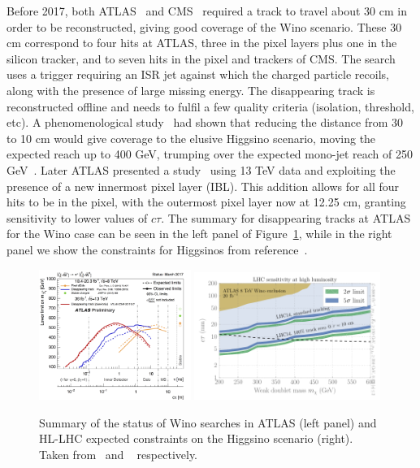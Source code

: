 Before 2017, both ATLAS~\cite{Aad:2013yna} and CMS~\cite{CMS:2014gxa} required a track to travel about 30 cm in order to be reconstructed, giving good coverage of the Wino scenario. These 30 cm correspond to four hits at ATLAS, three in the pixel layers plus one in the silicon tracker, and to seven hits in the pixel and trackers of CMS. The search uses a trigger requiring an ISR jet against which the charged particle recoils, along with the presence of large missing energy. The disappearing track is reconstructed offline and needs to fulfil a few quality criteria (isolation, \pT threshold, etc). A phenomenological study~\cite{Mahbubani:2017gjh} had shown that reducing the distance from 30 to 10 cm would give coverage to the elusive Higgsino scenario, moving the expected reach up to 400 GeV, trumping over the expected mono-jet reach of 250 GeV~\cite{Schwaller:2013baa,Low:2014cba,Barducci:2015ffa}. Later ATLAS presented a study~\cite{ATLAS-CONF-2017-017} using 13 TeV data and exploiting the presence of a new innermost pixel layer (IBL). This addition allows for all four hits to be in the pixel, with the outermost pixel layer now at 12.25 cm,  granting sensitivity to lower values of $c \tau$. The summary for disappearing tracks at ATLAS for the Wino case can be seen in the left panel of Figure~\ref{fig:ewkinosearches}, while in the right panel we show the constraints for Higgsinos from reference~\cite{Mahbubani:2017gjh}.

\begin{figure}[htb]
\centering
\includegraphics[width=0.44\textwidth]{plots/ATLAS_SUSY_LLPChargino.png}
\includegraphics[width=0.54\textwidth]{plots/Higgsino_Significance14}
\caption{Summary of the status of Wino searches in ATLAS (left panel) and HL-LHC expected constraints on the Higgsino scenario (right). Taken from~\cite{ATLAS:summary} and ~\cite{Mahbubani:2017gjh} respectively.}
  \label{fig:ewkinosearches}
\end{figure}

